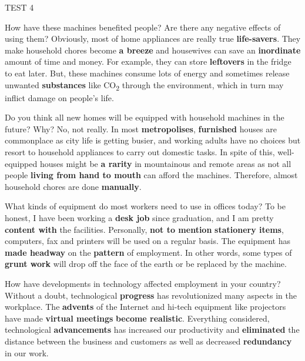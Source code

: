 \begin{glossarymc}[Cambridge 7]
\begin{test}{TEST 4}
    \begin{qa}{How have these machines benefited people? Are there any negative effects of using them?}
    Obviously, most of home appliances are really true \textbf{life-savers}. They make household chores become \textbf{a breeze} and housewives can save an \textbf{inordinate} amount of time and money. For example, they can store \textbf{leftovers} in the fridge to eat later. But, these machines consume lots of energy and sometimes release unwanted \textbf{substances} like CO\textsubscript{2} through the environment, which in turn may inflict damage on people's life.
    \end{qa}

    \begin{qa}{Do you think all new homes will be equipped with household machines in the future? Why?}
    No, not really. In most \textbf{metropolises}, \textbf{furnished} houses are commonplace as city life is getting busier, and working adults have no choices but resort to household appliances to carry out domestic tasks. In spite of this, well-equipped houses might be \textbf{a rarity} in mountainous and remote areas as not all people \textbf{living from hand to mouth} can afford the machines. Therefore, almost household chores are done \textbf{manually}.
    \end{qa}

    \begin{qa}{What kinds of equipment do most workers need to use in offices today?}
    To be honest, I have been working a \textbf{desk job} since graduation, and I am pretty \textbf{content with} the facilities. Personally, \textbf{not to mention} \textbf{stationery items}, computers, fax and printers will be used on a regular basis. The equipment has \textbf{made headway} on the \textbf{pattern} of employment. In other words, some types of \textbf{grunt work} will drop off the face of the earth or be replaced by the machine.
    \end{qa}

    \begin{qa}{How have developments in technology affected employment in your country?}
    Without a doubt, technological \textbf{progress} has revolutionized many aspects in the workplace. The \textbf{advents} of the Internet and hi-tech equipment like projectors have made \textbf{virtual meetings} \textbf{become realistic}. Everything considered, technological \textbf{advancements} has increased our productivity and \textbf{eliminated} the distance between the business and customers as well as decreased \textbf{redundancy} in our work.
    \end{qa}


\end{test}
\end{glossarymc}
